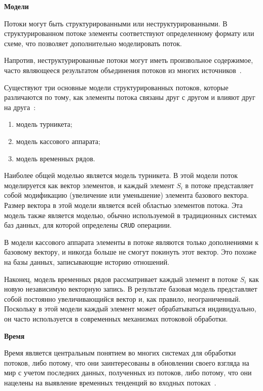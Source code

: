 \clearpage %

\textbf{Модели}

Потоки могут быть структурированными или неструктурированными. 
В структурированном потоке элементы соответствуют определенному формату или схеме, что позволяет дополнительно моделировать поток. 

Напротив, неструктурированные потоки могут иметь произвольное содержимое, часто являющееся результатом объединения потоков из многих источников~\cite{10.1007/978-3-642-53974-9_6}.

Существуют три основные модели структурированных потоков, которые различаются по тому, как элементы потока связаны друг с другом и влияют друг на друга~\cite{stream-def}: 
\begin{enumerate}
  \item модель турникета;
  \item модель кассового аппарата; 
  \item модель временных рядов. 
\end{enumerate}

Наиболее общей моделью является модель турникета. 
В этой модели поток моделируется как вектор элементов, и каждый элемент $S_{i}$ в потоке представляет собой модификацию (увеличение или уменьшение) элемента базового вектора. 
Размер вектора в этой модели является всей областью элементов потока. 
Эта модель также является моделью, обычно используемой в традиционных системах баз данных, для которой определены \texttt{CRUD} операциии. 

В модели кассового аппарата элементы в потоке являются только дополнениями к базовому вектору, и никогда больше не смогут покинуть этот вектор. 
Это похоже на базы данных, записывающие историю отношений. 

Наконец, модель временных рядов рассматривает каждый элемент в потоке $S_{i}$ как новую независимую векторную запись. 
В результате базовая модель представляет собой постоянно увеличивающийся вектор и, как правило, неограниченный. 
Поскольку в этой модели каждый элемент может обрабатываться индивидуально, он часто используется в современных механизмах потоковой обработки.

\clearpage %

\textbf{Время}

Время является центральным понятием во многих системах для обработки потоков, либо потому, что они заинтересованы в обновлении своего взгляда на мир с учетом последних данных, полученных из потоков, либо потому, что они нацелены на выявление временных тенденций во входных потоках~\cite{stream-def}. 

